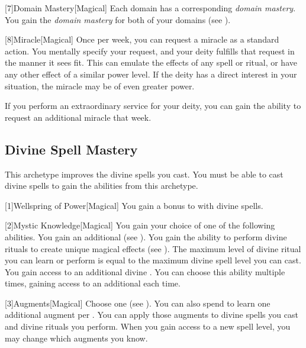         [7]{Domain Mastery}[Magical]
        Each domain has a corresponding \textit{domain mastery}.
        You gain the \textit{domain mastery} for both of your domains (see ).

        [8]{Miracle}[Magical]
        Once per week, you can request a miracle as a standard action.
        You mentally specify your request, and your deity fulfills that request in the manner it sees fit.
        This can emulate the effects of any spell or ritual, or have any other effect of a similar power level.
        If the deity has a direct interest in your situation, the miracle may be of even greater power.

        If you perform an extraordinary service for your deity, you can gain the ability to request an additional miracle that week.

    \subsection{Divine Spell Mastery}
        This archetype improves the divine spells you cast.
        You must be able to cast divine spells to gain the abilities from this archetype.

        [1]{Wellspring of Power}[Magical]
        You gain a  bonus to  with divine spells.

        [2]{Mystic Knowledge}[Magical]
        You gain your choice of one of the following abilities.
        {
             You gain an additional  (see ).
             You gain the ability to perform divine rituals to create unique magical effects (see ).
            The maximum level of divine ritual you can learn or perform is equal to the maximum divine spell level you can cast.
             You gain access to an additional divine .
                You can choose this ability multiple times, gaining access to an additional  each time.
        }

        [3]{Augments}[Magical]
        Choose one  (see ).
        You can also spend  to learn one additional augment per .
        You can apply those augments to divine spells you cast and divine rituals you perform.
        When you gain access to a new spell level, you may change which augments you know.

